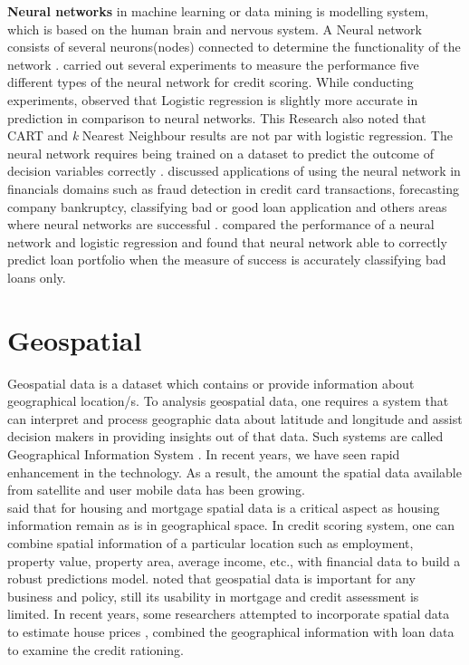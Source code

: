 {\textbf{Neural networks} in machine learning or data mining is modelling system, which is based on the human brain and nervous system. A Neural network consists of several neurons(nodes) connected to determine the functionality of the network \citep{demuth2008neural}. \citet{west2000neural} carried out several experiments to measure the performance five different types of the neural network for credit scoring. While conducting experiments, \citet{west2000neural} observed that Logistic regression is slightly more accurate in prediction in comparison to neural networks. This Research also noted that CART and \emph{k} Nearest Neighbour results are not par with logistic regression. The neural network requires being trained on a dataset to predict the outcome of decision variables correctly \citep{presky1996functional}. \citet{gately1995neural} discussed applications of using the neural network in financials domains such as fraud detection in credit card transactions, forecasting company bankruptcy, classifying bad or good loan application and others areas where neural networks are successful \citep{ghosh1994credit}. \citet{desai1996comparison} compared the performance of a neural network and logistic regression and found that neural network able to correctly predict loan portfolio when the measure of success is accurately classifying bad loans only.

\section{Geospatial}

Geospatial data is a dataset which contains or provide information about geographical location/s. To analysis geospatial data, one requires a system that can interpret and process geographic data about latitude and longitude and assist decision makers in providing insights out of that data. Such systems are called Geographical Information System \citep{keenan1998spatial}. In recent years, we have seen rapid enhancement in the technology. As a result, the amount the spatial data available from satellite and user mobile data has been growing.\\

\citet{can1998gis} said that for housing and mortgage spatial data is a critical aspect as housing information remain as is in geographical space. In credit scoring system, one can combine spatial information of a particular location such as employment, property value, property area, average income, etc., with financial data to build a robust predictions model. \citet{can1998gis} noted that geospatial data is important for any business and policy, still its usability in mortgage and credit assessment is limited. In recent years, some researchers attempted to incorporate spatial data to estimate house prices  \citep{tse2002estimating}, \citet{carling2005asymmetric} combined the geographical information with loan data to examine the credit rationing.\\

}

